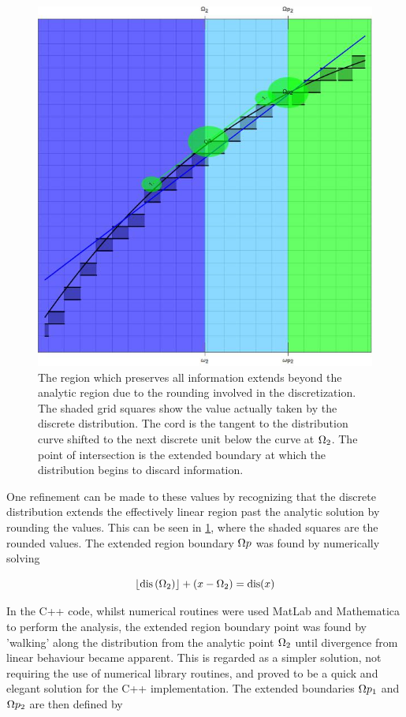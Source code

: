 \begin{figure}[h]
\centering
\includegraphics[width=0.7\linewidth]{Chapter2/Figs/ExtensionToLinearRegion}
\caption{The region which preserves all information extends beyond the analytic region due to the rounding involved in the discretization. The shaded grid squares show the value actually taken by the discrete distribution. The cord is the tangent to the distribution curve shifted to the next discrete unit below the curve at $\Omega_2$. The point of intersection is the extended boundary at which the distribution begins to discard information.}
\label{fig:ExtensionToLinearRegion}
\end{figure}

One refinement can be made to these values by recognizing that the discrete distribution extends the effectively linear region past the analytic solution by rounding the values. This can be seen in \ref{fig:ExtensionToLinearRegion}, where the shaded squares are the rounded values. The extended region boundary $\Omega p$ was found by numerically solving 

\begin{equation}
\left\lfloor\text{dis}\left(\Omega _2\right)\right\rfloor+\left(x-\Omega _2\right)=\text{dis}(x)
\end{equation}

In the C++ code, whilst numerical routines were used  MatLab and Mathematica to perform the analysis, the extended region boundary point was found by 'walking' along the distribution from the analytic point $\Omega_2$  until divergence from linear behaviour became apparent. This is regarded as a simpler solution, not requiring the use of numerical library routines, and proved to be a quick and elegant solution for the C++ implementation. The extended boundaries $\Omega p_1$ and $\Omega p_2$ are then defined by

